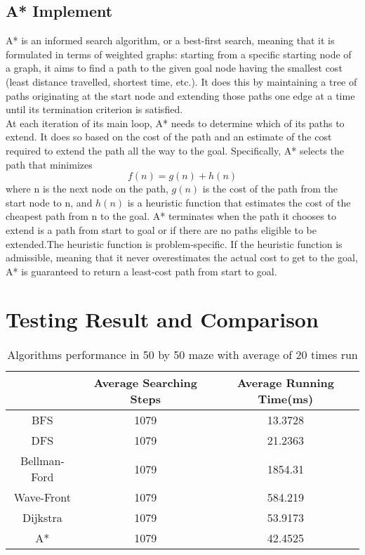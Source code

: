 \documentclass[11pt, onecolumn, letterpaper]{article}
\begin{document}
\subsection{A* Implement}
A* is an informed search algorithm, or a best-first search, meaning that it is formulated in terms of weighted graphs: starting from a specific starting node of a graph, it aims to find a path to the given goal node having the smallest cost (least distance travelled, shortest time, etc.). It does this by maintaining a tree of paths originating at the start node and extending those paths one edge at a time until its termination criterion is satisfied.\\
At each iteration of its main loop, A* needs to determine which of its paths to extend. It does so based on the cost of the path and an estimate of the cost required to extend the path all the way to the goal. Specifically, A* selects the path that minimizes
$$f(n)=g(n)+h(n)$$
where n is the next node on the path, $g(n)$ is the cost of the path from the start node to n, and $h(n)$ is a heuristic function that estimates the cost of the cheapest path from n to the goal. A* terminates when the path it chooses to extend is a path from start to goal or if there are no paths eligible to be extended.The heuristic function is problem-specific. If the heuristic function is admissible, meaning that it never overestimates the actual cost to get to the goal, A* is guaranteed to return a least-cost path from start to goal.

\section{Testing Result and Comparison}
\begin{table}[htbp]
\begin{center}
\begin{tabular}{|c| c c|}
\hline
 & Average Searching Steps & Average Running Time(ms)\\
\hline
BFS & 1079 & 13.3728\\
DFS & 1079 & 21.2363\\
Bellman-Ford & 1079 & 1854.31\\
Wave-Front & 1079 & 584.219\\
Dijkstra & 1079 & 53.9173\\
A* & 1079 & 42.4525\\
\hline
\end{tabular}
\end{center}
\caption{Algorithms performance in 50 by 50 maze with average of 20 times run}
\end{table}
\end{document}
